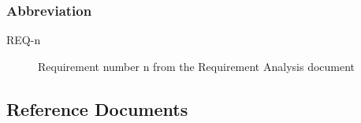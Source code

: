 \documentclass[a4paper]{article}
\begin{document}
            \subsubsection{Abbreviation}
            \begin{description}
                \item[REQ-n] Requirement number n from the Requirement Analysis document
            \end{description}
            
\subsection{Reference Documents}
\printbibliography[heading=none]

\end{document}
